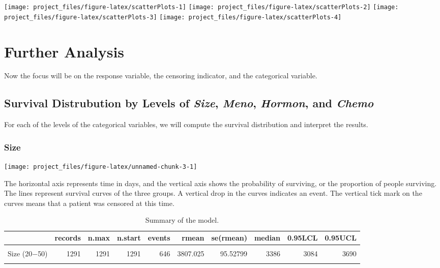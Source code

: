 \documentclass[
]{article}
\begin{document}
\texttt{[image: project\_files/figure-latex/scatterPlots-1]} \texttt{[image: project\_files/figure-latex/scatterPlots-2]} \texttt{[image: project\_files/figure-latex/scatterPlots-3]} \texttt{[image: project\_files/figure-latex/scatterPlots-4]}

\section{Further Analysis}

Now the focus will be on the response variable, the censoring indicator,
and the categorical variable.

\subsection{Survival Distrubution by Levels of \textit{Size}, \textit{Meno}, \textit{Hormon}, and \textit{Chemo}}

For each of the levels of the categorical variables, we will compute the survival distribution and interpret the results.

\subsubsection{Size}

\begin{center}\texttt{[image: project\_files/figure-latex/unnamed-chunk-3-1]} \end{center}

The horizontal axis represents time in days, and the vertical axis shows
the probability of surviving, or the proportion of people surviving. The
lines represent survival curves of the three groups. A vertical drop in
the curves indicates an event. The vertical tick mark on the curves
means that a patient was censored at this time.

\begin{table}[!h]

\caption{\label{tab:median-size}Summary of the model.}
\centering
\fontsize{8}{10}\selectfont
\begin{tabular}[t]{lrrrrrrrrr}
\toprule
  & records & n.max & n.start & events & rmean & se(rmean) & median & 0.95LCL & 0.95UCL\\
\midrule
\cellcolor{gray!6}{Size ($\leq$20)} & \cellcolor{gray!6}{1387} & \cellcolor{gray!6}{1387} & \cellcolor{gray!6}{1387} & \cellcolor{gray!6}{414} & \cellcolor{gray!6}{4721.199} & \cellcolor{gray!6}{119.40159} & \cellcolor{gray!6}{5653} & \cellcolor{gray!6}{4983} & \cellcolor{gray!6}{}\\
Size (20$-$50) & 1291 & 1291 & 1291 & 646 & 3807.025 & 95.52799 & 3386 & 3084 & 3690\\
\cellcolor{gray!6}{Size ($>$50)} & \cellcolor{gray!6}{304} & \cellcolor{gray!6}{304} & \cellcolor{gray!6}{304} & \cellcolor{gray!6}{212} & \cellcolor{gray!6}{2537.178} & \cellcolor{gray!6}{148.10071} & \cellcolor{gray!6}{1909} & \cellcolor{gray!6}{1566} & \cellcolor{gray!6}{2141}\\
\bottomrule
\end{tabular}
\end{table}
\end{document}
